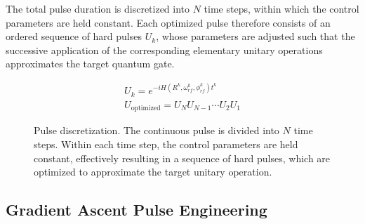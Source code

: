The total pulse duration is discretized into \(N\) time steps, within which the control parameters are held constant. Each optimized pulse therefore consists of an ordered sequence of hard pulses \(U_k\), whose parameters are adjusted such that the successive application of the corresponding elementary unitary operations approximates the target quantum gate.

\begin{equation}
\begin{gathered}
    U_k = e^{-iH(R^k,\omega_{rf}^k,\phi_{rf}^k)t^k} \\
    U_{\mathrm{optimized}} = U_N U_{N-1}\cdots U_2 U_1
\end{gathered}
\end{equation}

\begin{figure}[ht]
    \centering
{}
\caption{Pulse discretization. The continuous pulse is divided into \(N\) time steps. Within each time step, the control parameters are held constant, effectively resulting in a sequence of hard pulses, which are optimized to approximate the target unitary operation.}
    \label{fig:discretization}
\end{figure}


\subsection{Gradient Ascent Pulse Engineering}
\label{GRAPE}

